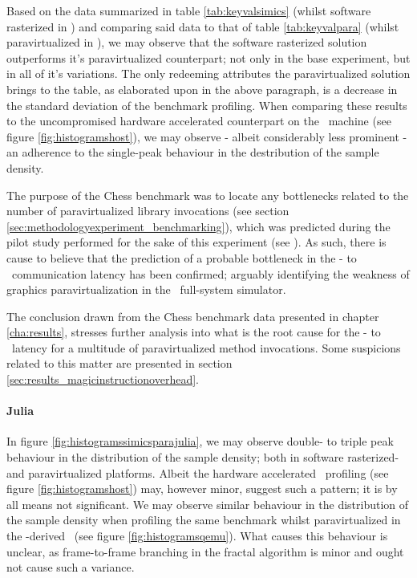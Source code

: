 Based on the data summarized in table \ref{tab:keyvalsimics} (whilst software rasterized in \dvttermsimics ) and comparing said data to that of table \ref{tab:keyvalpara} (whilst paravirtualized in \dvttermsimics ), we may observe that the software rasterized solution outperforms it's paravirtualized counterpart; not only in the base experiment, but in all of it's variations.
The only redeeming attributes the paravirtualized solution brings to the table, as elaborated upon in the above paragraph, is a decrease in the standard deviation of the benchmark profiling.
When comparing these results to the uncompromised hardware accelerated counterpart on the \dvttermhost\ machine (see figure \ref{fig:histogramshost}), we may observe - albeit considerably less prominent - an adherence to the single-peak behaviour in the destribution of the sample density.

The purpose of the Chess benchmark was to locate any bottlenecks related to the number of paravirtualized library invocations (see section \ref{sec:methodologyexperiment_benchmarking}), which was predicted during the pilot study performed for the sake of this experiment (see ).
As such, there is cause to believe that the prediction of a probable bottleneck in the \dvttermtarget - to \dvttermhost\ communication latency has been confirmed; arguably identifying the weakness of graphics paravirtualization in the \dvttermsimics\ full-system simulator.

The conclusion drawn from the Chess benchmark data presented in chapter \ref{cha:results}, stresses further analysis into what is the root cause for the \dvttermtarget - to \dvttermhost\ latency for a multitude of paravirtualized method invocations.
Some suspicions related to this matter are presented in section \ref{sec:results_magicinstructionoverhead}. 




\paragraph{Julia}
\label{par:results_julia}
In figure \ref{fig:histogramssimicsparajulia}, we may observe double- to triple peak behaviour in the distribution of the sample density; both in software rasterized- and paravirtualized platforms.
Albeit the hardware accelerated \dvttermhost\ profiling (see figure \ref{fig:histogramshost}) may, however minor, suggest such a pattern; it is by all means not significant.
We may observe similar behaviour in the distribution of the sample density when profiling the same benchmark whilst paravirtualized in the \dvttermqemu -derived \dvttermandroidemulator\ (see figure \ref{fig:histogramsqemu}).
What causes this behaviour is unclear, as frame-to-frame branching in the fractal algorithm is minor and ought not cause such a variance.

